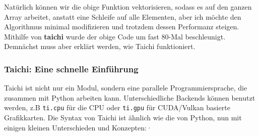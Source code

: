 \documentclass{article}
\begin{document}
Natürlich können wir die obige Funktion vektorisieren, sodass es auf den ganzen Array arbeitet, anstatt eine Schleife auf alle Elementen, aber ich möchte den Algorithmus minimal modifizieren und trotzdem dessen Performanz steigen. Mithilfe von \textbf{taichi} wurde der obige Code um fast 80-Mal beschleunigt. Demnächst muss aber erklärt werden, wie Taichi funktioniert.

\subsubsection{Taichi: Eine schnelle Einführung}
Taichi ist nicht nur ein Modul, sondern eine parallele Programmiersprache, die zusammen mit Python arbeiten kann. Unterschiedliche Backends können benutzt werden, z.B \lstinline|ti.cpu| für die CPU oder \lstinline|ti.gpu| für CUDA/Vulkan basierte Grafikkarten. Die Syntax von Taichi ist ähnlich wie die von Python, nun mit einigen kleinen Unterschieden und Konzepten:·
\end{document}
